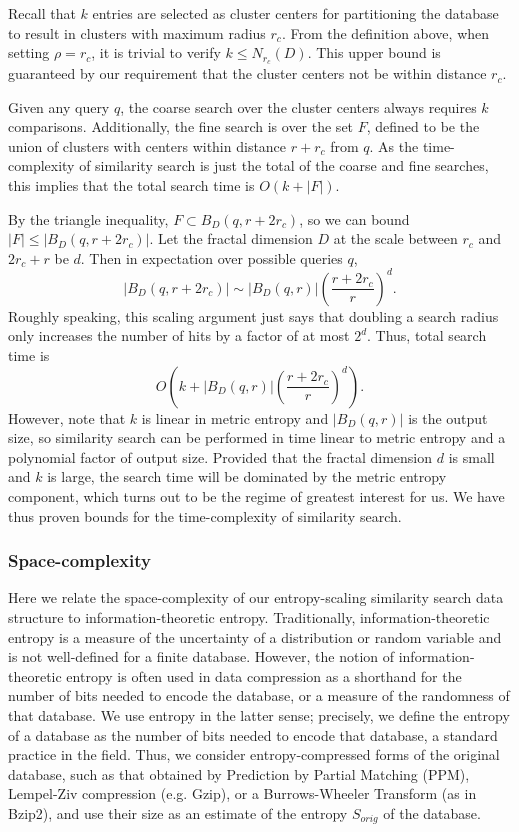 \documentclass[review,preprint,12pt]{elsarticle}
\theoremstyle{definition}
\theoremstyle{remark}
\begin{document}
Recall that $k$ entries are selected as cluster centers for partitioning the database to result in clusters with maximum radius $r_c$.
From the definition above, when setting $\rho = r_c$, it is trivial to verify $ k \le N_{r_c} (D)$.
This upper bound is guaranteed by our requirement that the cluster centers not be within distance $r_c$.

Given any query $q$, the coarse search over the cluster centers always requires $k$ comparisons.
Additionally, the fine search is over the set $F$, defined to be the union of clusters with centers within distance $r+r_c$ from $q$.
As the time-complexity of similarity search is just the total of the coarse and fine searches, this implies that the total search time is $O(k + |F|)$.

By the triangle inequality, $F \subset B_D(q,r+2r_c)$,
so we can bound $|F| \le |B_D(q,r+2r_c)|$.
Let the fractal dimension $D$ at the scale between $r_c$ and $2r_c + r$ be $d$.
Then in expectation over possible queries $q$,
\[
    \left|B_D(q, r+2r_c)\right| \sim \left|B_D(q,r)\right|\left(\frac{r+2r_c}{r}\right)^d .
\]
Roughly speaking, this scaling argument just says that doubling a search radius only increases the number of hits by a factor of at most $2^d$.
Thus, total search time is 
\[
    O\left(k + \left|B_D(q,r)\right|\left(\frac{r+2r_c}{r}\right)^d \right).
\]
However, note that $k$ is linear in metric entropy and $|B_D(q,r)|$ is the output size, so similarity search can be performed in time linear to metric entropy and a polynomial factor of output size.
Provided that the fractal dimension $d$ is small and $k$ is large, the search time will be dominated by the metric entropy component, which turns out to be the regime of greatest interest for us.
We have thus proven bounds for the time-complexity of similarity search.

\subsubsection{Space-complexity}
Here we relate the space-complexity of our entropy-scaling similarity search data structure to information-theoretic entropy.
Traditionally, information-theoretic entropy is a measure of the uncertainty of a distribution or random variable and is not well-defined for a finite database.
However, the notion of information-theoretic entropy is often used in data compression as a shorthand for the number of bits needed to encode the database, or a measure of the randomness of that database.
We use entropy in the latter sense; precisely, we define the entropy of a database as the number of bits needed to encode that database, a standard practice in the field.
Thus, we consider entropy-compressed forms of the original database, such as that obtained by Prediction by Partial Matching (PPM), Lempel-Ziv compression (e.g. Gzip), or a Burrows-Wheeler Transform (as in Bzip2), and use their size as an estimate of the entropy $S_{orig}$ of the database.
\end{document}
